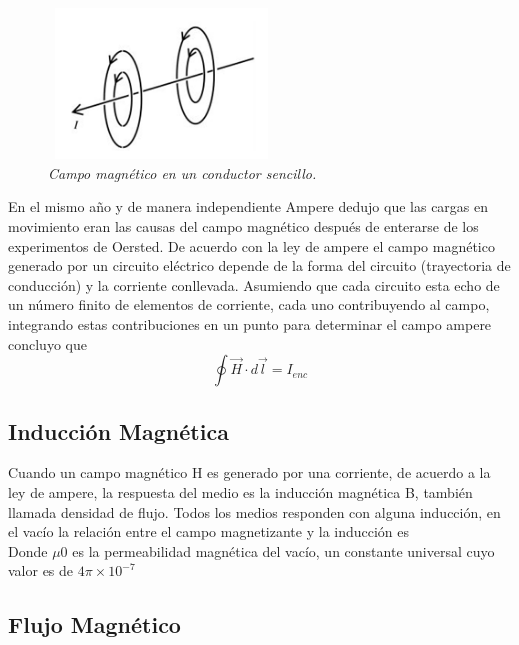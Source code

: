 \begin{figure}[htb]
\begin{center}
\centering
	\includegraphics[width=6cm, height=4cm]{images/Capitulo_1/Campo_magnetico_en_un_conductor_sencillo}
	\caption{\textit{Campo magnético en un conductor sencillo.}}
	\label{fig:system:example1}	
\end{center}
\end{figure}
En el mismo año y de manera independiente Ampere dedujo que las cargas en movimiento eran las causas del campo magnético después de enterarse de los experimentos de Oersted. De acuerdo con la ley de ampere el campo magnético generado por un circuito eléctrico depende de la forma del circuito (trayectoria de conducción) y la corriente conllevada. Asumiendo que cada circuito esta echo de un número finito de elementos de corriente, cada uno contribuyendo al campo, integrando estas contribuciones en un punto para determinar el campo ampere concluyo que\\
\begin{equation}
	 \oint {\overrightarrow{H} \cdot d \overrightarrow{l}} =  I_{enc}
\end{equation}

\subsection{Inducción Magnética}
Cuando un campo magnético  H es generado por una corriente, de acuerdo a la ley de ampere,  la respuesta del medio es la inducción magnética B, también llamada densidad de flujo. Todos los medios responden con alguna inducción, en el vacío la relación entre el campo magnetizante y la inducción es \\ 	
Donde  $\mu$0 es la permeabilidad magnética del vacío, un constante universal cuyo valor es de $4\pi\times10^{-7}$

\subsection{Flujo Magnético}

